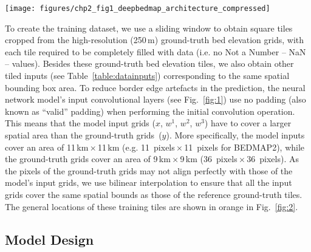\begin{figure*}[t]
  \texttt{[image: figures/chp2\_fig1\_deepbedmap\_architecture\_compressed]}
  \caption[DeepBedMap generator model architecture]{
    DeepBedMap generator model architecture composed of three modules.
    The input module processes each of the four inputs (BEDMAP2, \citealp{FretwellBedmap2improvedice2013}; REMA, \citealp{HowatReferenceElevationModel2019}; MEaSUREs Ice Velocity, \citealp{MouginotMEaSUREsPhaseMap2019}; snow accumulation, \citealp{ArthernAntarcticsnowaccumulation2006}; see also Table~\ref{table:datainputs}) into a consistent tensor.
    The core module processes the rich information contained within the concatenated inputs.
    The upsampling module scales the tensor up by 4 times and does some extra processing to produce the output DeepBedMap\_DEM.
  }
  \label{fig:1}
\end{figure*}

To create the training dataset, we use a sliding window to obtain square tiles cropped from the high-resolution (250\,\unit{m}) ground-truth bed elevation grids, with each tile required to be completely filled with data (i.e.
no Not a Number -- NaN -- values).
Besides these ground-truth bed elevation tiles, we also obtain other tiled inputs (see Table~\ref{table:datainputs}) corresponding to the same spatial bounding box area.
To reduce border edge artefacts in the prediction, the neural network model's input convolutional layers (see Fig.~\ref{fig:1}) use no padding (also known as ``valid'' padding) when performing the initial convolution operation.
This means that the model input grids ($x$, $w^1$, $w^2$, $w^3$) have to cover a larger spatial area than the ground-truth grids~($y$).
More specifically, the model inputs cover an area of 11\,\unit{km}\,$\times$\,11\,\unit{km} (e.g. 11~\unit{pixels}\,$\times$\,11~\unit{pixels} for BEDMAP2), while the ground-truth grids cover an area of 9\,\unit{km}\,$\times$\,9\,\unit{km} (36~\unit{pixels}\,$\times$\,36~\unit{pixels}).
As the pixels of the ground-truth grids may not align perfectly with those of the model's input grids, we use bilinear interpolation to ensure that all the input grids cover the same spatial bounds as those of the reference ground-truth tiles.
The general locations of these training tiles are shown in orange in Fig.~\ref{fig:2}.

\subsection{Model Design} \label{section:modeldesign}

